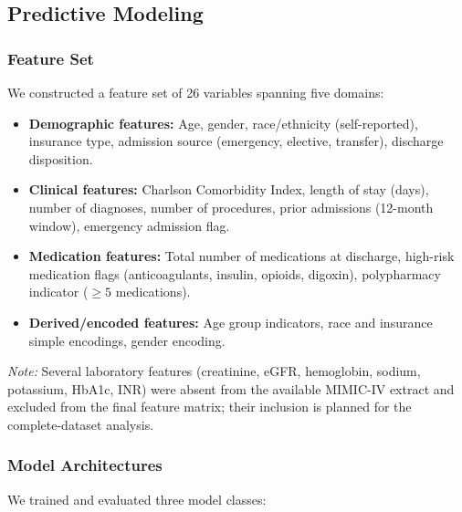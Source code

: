 \documentclass[11pt,letterpaper]{article}
\begin{document}
\subsection{Predictive Modeling}
\label{sec:modeling}

\subsubsection{Feature Set}

We constructed a feature set of 26 variables spanning five domains:

\begin{itemize}[leftmargin=1.5em,itemsep=0.1em]
  \item \textbf{Demographic features:} Age, gender, race/ethnicity (self-reported), insurance type, admission source (emergency, elective, transfer), discharge disposition.
  \item \textbf{Clinical features:} Charlson Comorbidity Index, length of stay (days), number of diagnoses, number of procedures, prior admissions (12-month window), emergency admission flag.
  \item \textbf{Medication features:} Total number of medications at discharge, high-risk medication flags (anticoagulants, insulin, opioids, digoxin), polypharmacy indicator ($\geq 5$ medications).
  \item \textbf{Derived/encoded features:} Age group indicators, race and insurance simple encodings, gender encoding.
\end{itemize}

\textit{Note:} Several laboratory features (creatinine, eGFR, hemoglobin, sodium, potassium, HbA1c, INR) were absent from the available MIMIC-IV extract and excluded from the final feature matrix; their inclusion is planned for the complete-dataset analysis.

\subsubsection{Model Architectures}

We trained and evaluated three model classes:
\end{document}
